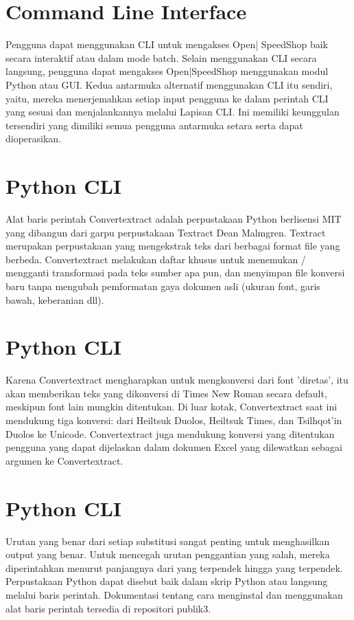 \documentclass[12pt, times new roman, a4paper]{article}
\begin{document}
\section{Command Line Interface}
Pengguna dapat menggunakan CLI untuk mengakses Open| SpeedShop baik secara interaktif atau dalam mode batch. Selain menggunakan CLI secara langsung, pengguna dapat mengakses Open|SpeedShop menggunakan modul Python atau GUI. Kedua antarmuka alternatif menggunakan CLI itu sendiri, yaitu, mereka menerjemahkan setiap input pengguna ke dalam perintah CLI yang sesuai dan menjalankannya melalui Lapisan CLI. Ini memiliki keunggulan tersendiri yang dimiliki semua pengguna antarmuka setara serta dapat dioperasikan.

\section{Python CLI}
Alat baris perintah Convertextract adalah perpustakaan Python berlisensi MIT yang dibangun dari garpu perpustakaan Textract Dean Malmgren. Textract merupakan perpustakaan yang mengekstrak teks dari berbagai format file yang berbeda. Convertextract melakukan daftar khusus untuk menemukan / mengganti transformasi pada teks sumber apa pun, dan menyimpan file konversi baru tanpa mengubah pemformatan gaya dokumen asli (ukuran font, garis bawah, keberanian dll).

\section{Python CLI}
Karena Convertextract mengharapkan untuk mengkonversi dari font 'diretas', itu akan memberikan teks yang dikonversi di Times New Roman secara default, meskipun font lain mungkin ditentukan. Di luar kotak, Convertextract saat ini mendukung tiga konversi: dari Heiltsuk Duolos, Heiltsuk Times, dan Tsilhqot’in Duolos ke Unicode. Convertextract juga mendukung konversi yang ditentukan pengguna yang dapat dijelaskan dalam dokumen Excel yang dilewatkan sebagai argumen ke Convertextract.

\section{Python CLI}
Urutan yang benar dari setiap substitusi sangat penting untuk menghasilkan output yang benar. Untuk mencegah urutan penggantian yang salah, mereka diperintahkan menurut panjangnya dari yang terpendek hingga yang terpendek. Perpustakaan Python dapat disebut baik dalam skrip Python atau langsung melalui baris perintah. Dokumentasi tentang cara menginstal dan menggunakan alat baris perintah tersedia di repositori publik3.
\end{document}
